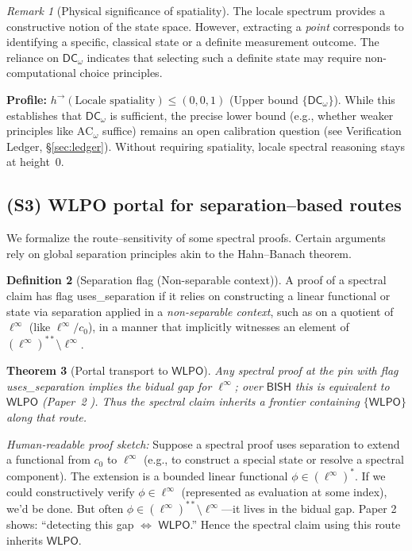 \documentclass[11pt]{article}
\newcommand{\WLPO}{\mathsf{WLPO}}
\newcommand{\DCw}{\mathsf{DC}_{\omega}}
\theoremstyle{plain}
\newtheorem{theorem}{Theorem}[section]
\theoremstyle{definition}
\newtheorem{definition}[theorem]{Definition}
\theoremstyle{remark}
\newtheorem{remark}[theorem]{Remark}
\newenvironment{hrproof}{\noindent\textit{Human-readable proof sketch:} }{}
\newcommand{\linf}{\ell^\infty}
\newcommand{\BISH}{\mathsf{BISH}}
\newcommand{\ACw}{\mathrm{AC}_\omega}
\begin{document}
\begin{remark}[Physical significance of spatiality]
The locale spectrum provides a constructive notion of the state space. However, extracting a \emph{point} corresponds to identifying a specific, classical state or a definite measurement outcome. The reliance on $\DCw$ indicates that selecting such a definite state may require non-computational choice principles.
\end{remark}

\noindent\textbf{Profile:} $h^{\to}(\text{Locale spatiality})\le (0,0,1)$ (Upper bound $\{\DCw\}$). While this establishes that $\DCw$ is sufficient, the precise lower bound (e.g., whether weaker principles like $\ACw$ suffice) remains an open calibration question (see Verification Ledger, \S\ref{sec:ledger}). Without requiring spatiality, locale spectral reasoning stays at height~0.

\subsection{(S3) WLPO portal for separation--based routes}
We formalize the route--sensitivity of some spectral proofs. Certain arguments rely on global separation principles akin to the Hahn--Banach theorem.

\begin{definition}[Separation flag (Non-separable context)]
A proof of a spectral claim has flag \textsf{uses\_separation} if it relies on constructing a linear functional or state via separation applied in a \emph{non-separable context}, such as on a quotient of $\linf$ (like $\linf/c_0$), in a manner that implicitly witnesses an element of $(\linf)^{**}\setminus \linf$.
\end{definition}

\begin{theorem}[Portal transport to $\WLPO$]
Any spectral proof at the pin with flag \textsf{uses\_separation} implies the bidual gap for $\linf$; over $\BISH$ this is equivalent to $\WLPO$ (Paper~2 \cite{Paper2}). Thus the spectral claim inherits a frontier containing $\{\WLPO\}$ along that route.
\end{theorem}

\begin{hrproof}
Suppose a spectral proof uses separation to extend a functional from $c_0$ to $\ell^\infty$ (e.g., to construct a special state or resolve a spectral component). The extension is a bounded linear functional $\phi\in (\ell^\infty)^*$. If we could constructively verify $\phi\in\ell^\infty$ (represented as evaluation at some index), we'd be done. But often $\phi\in (\ell^\infty)^{**}\setminus\ell^\infty$---it lives in the bidual gap. Paper 2 shows: ``detecting this gap $\Leftrightarrow$ $\WLPO$.'' Hence the spectral claim using this route inherits $\WLPO$.
\end{hrproof}
\end{document}
